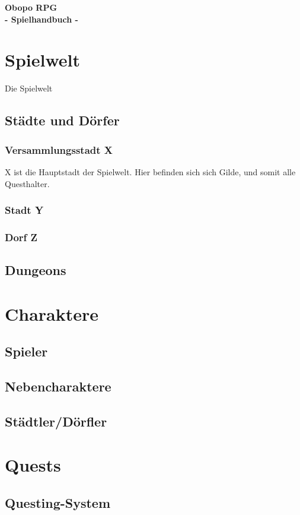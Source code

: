 \documentclass[a4paper,11pt]{article}
\begin{document}
\centering
{\huge \textbf{Obopo RPG}} \\ \vspace{10mm}
{\Large \textbf{- Spielhandbuch -} \vspace{10mm}}

\flushleft
\newpage
\tableofcontents
\newpage
\section{Spielwelt}
Die Spielwelt 
\subsection{Städte und Dörfer}
\subsubsection{Versammlungsstadt X}
X ist die Hauptstadt der Spielwelt. Hier befinden sich sich Gilde, und somit alle Questhalter.
\subsubsection{Stadt Y}
\subsubsection{Dorf Z}

\subsection{Dungeons}

\section{Charaktere}
\subsection{Spieler}
\subsection{Nebencharaktere}
\subsection{Städtler/Dörfler}

\section{Quests}
\subsection{Questing-System}
\end{document}
